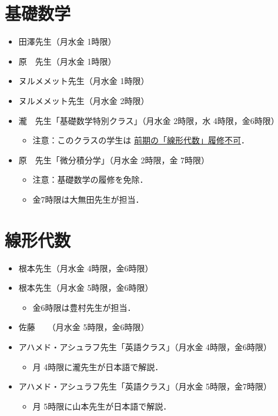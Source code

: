 \documentclass[a4j,landscape,25pt]{jsarticle}
\begin{document}
\section{基礎数学}

\begin{itemize}
 \item 田澤先生（月水金 1時限）
 \item 原　先生（月水金 1時限）
 \item ヌルメメット先生（月水金 1時限）
 \item ヌルメメット先生（月水金 2時限）
\end{itemize}

\begin{itemize}
 \item 瀧　先生「基礎数学特別クラス」（月水金 2時限，水 4時限，金6時限）
\begin{itemize}
 \item 注意：このクラスの学生は
\underline{前期の「線形代数」履修不可}．
\end{itemize}
\end{itemize}

\begin{itemize}
 \item 原　先生「微分積分学」（月水金 2時限，金 7時限）
\begin{itemize}
 \item 注意：基礎数学の履修を免除．
 \item 金7時限は大無田先生が担当．
\end{itemize}
\end{itemize}

\section{線形代数}

\begin{itemize}
 \item 根本先生（月水金 4時限，金6時限）
 \item 根本先生（月水金 5時限，金6時限）
\begin{itemize}
 \item 金6時限は豊村先生が担当．
\end{itemize}
 \item 佐藤　　（月水金 5時限，金6時限）
\end{itemize}

\begin{itemize}
 \item アハメド・アシュラフ先生「英語クラス」（月水金 4時限，金6時限）
\begin{itemize}
 \item 月 4時限に瀧先生が日本語で解説．
\end{itemize}
 \item アハメド・アシュラフ先生「英語クラス」（月水金 5時限，金7時限）
\begin{itemize}
 \item 月 5時限に山本先生が日本語で解説．
\end{itemize}
\end{itemize}
\end{document}
